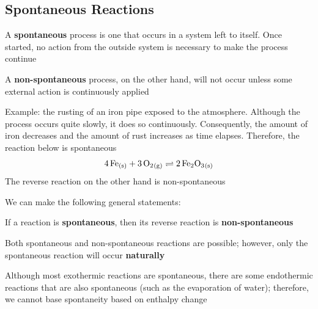 \subsection{Spontaneous Reactions}
\begin{bulleted-list}
    \item A \textbf{spontaneous} process is one that occurs in a system left to itself. Once started,
        no action from the outside system is necessary to make the process continue
    \item A \textbf{non-spontaneous} process, on the other hand, will not occur unless some external
        action is continuously applied
    \item Example: the rusting of an iron pipe exposed to the atmosphere. Although the process
        occurs quite slowly, it does so continuously. Consequently, the amount of iron decreases
        and the amount of rust increases as time elapses. Therefore, the reaction below is 
        spontaneous
        \[
            \ch{4Fe_{(s)}}+\ch{3O2_{(g)}}\rightleftharpoons \ch{2Fe2O3_{(s)}}
        \]
        The reverse reaction on the other hand is non-spontaneous
\end{bulleted-list}

We can make the following general statements:
\begin{bulleted-list}
    \item If a reaction is \textbf{spontaneous}, then its reverse reaction is \textbf{non-spontaneous}
    \item Both spontaneous and non-spontaneous reactions are possible; however, only the spontaneous
        reaction will occur \textbf{naturally}
    \item Although most exothermic reactions are spontaneous, there are some endothermic reactions
        that are also spontaneous (such as the evaporation of water); therefore, we cannot base
        spontaneity based on enthalpy change
\end{bulleted-list}

